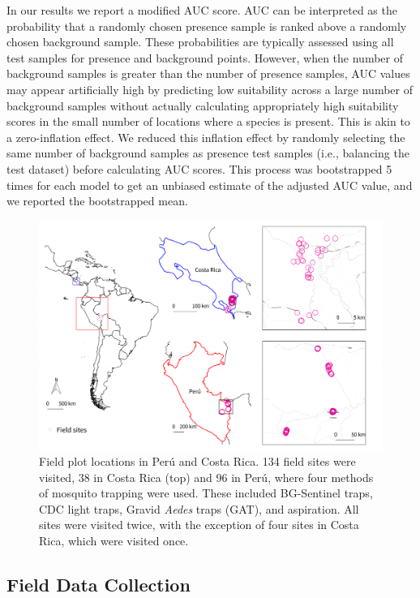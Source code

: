 In our results we report a modified AUC score. AUC can be interpreted as the probability that a randomly chosen presence sample is ranked above a randomly chosen background sample. These probabilities are typically assessed using all test samples for presence and background points. However, when the number of background samples is greater than the number of presence samples, AUC values may appear artificially high by predicting low suitability across a large number of background samples without actually calculating appropriately high suitability scores in the small number of locations where a species is present. This is akin to a zero-inflation effect. We reduced this inflation effect by randomly selecting the same number of background samples as presence test samples (i.e., balancing the test dataset) before calculating AUC scores. This process was bootstrapped 5 times for each model to get an unbiased estimate of the adjusted AUC value, and we reported the bootstrapped mean.

\begin{figure}[!ht]
\includegraphics[width=\textwidth]{figures/ch3-map-field.pdf}
\centering
\caption[Field plot locations in Perú and Costa Rica.]{Field plot locations in Perú and Costa Rica. 134 field sites were visited, 38 in Costa Rica (top) and 96 in Perú, where four methods of mosquito trapping were used. These included BG-Sentinel traps, CDC light traps, Gravid \textit{Aedes} traps (GAT), and aspiration. All sites were visited twice, with the exception of four sites in Costa Rica, which were visited once.}
\label{fig:map-field}
\end{figure}

\subsection{Field Data Collection}


